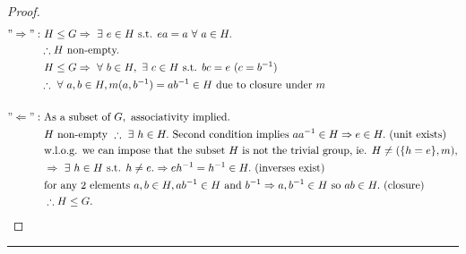 \documentclass{article}
\theoremstyle{definition}
\theoremstyle{remark}
\begin{document}
\begin{proof}
	\begin{align*}
		"\Rightarrow": & ~H\leq G\Rightarrow ~\exists~ e\in H\text{ s.t. } ea=a~\forall~a\in H.                                                                   \\
		               & \therefore H\text{ non-empty.}                                                                                                           \\
		               & ~H\leq G\Rightarrow ~\forall ~ b\in H,~\exists~c\in H\text{ s.t. }bc=e~(c=b^{-1})                                                        \\
		               & \therefore ~\forall~ a,b\in H,m(a,b^{-1})=ab^{-1}\in H\text{ due to closure under } m                                                    \\
		~                                                                                                                                                         \\
		"\Leftarrow":  & \text{ As a subset of } G,\text{ associativity implied.}                                                                                 \\
		               & ~ H \text{ non-empty } \therefore ~\exists~h\in H.\text{ Second condition implies } aa^{-1}\in H\Rightarrow e\in H.\text{ (unit exists)} \\
		               & \text{ w.l.o.g. we can impose that the subset }H\text{ is not the trivial group, ie. }H\neq(\lbrace h=e\rbrace,m),                       \\
		               & ~\Rightarrow ~\exists~h\in H\text{ s.t. } h\neq e.\Rightarrow eh^{-1}=h^{-1}\in H.\text{ (inverses exist)}                               \\
		               & ~\text{for any 2 elements } a,b\in H, ab^{-1}\in H\text{ and } b^{-1}\Rightarrow a,b^{-1}\in H\text{ so } ab\in H. \text{ (closure)}     \\
		               & ~\therefore H\leq G.
	\end{align*}
\end{proof}
\hrule
\vspace{2mm}
\end{document}
